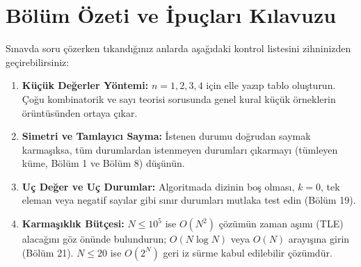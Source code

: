 \section{Bölüm Özeti ve İpuçları Kılavuzu}

Sınavda soru çözerken tıkandığınız anlarda aşağıdaki kontrol listesini zihninizden geçirebilirsiniz:

\begin{enumerate}
    \item \textbf{Küçük Değerler Yöntemi:} $n = 1, 2, 3, 4$ için elle yazıp tablo oluşturun. Çoğu kombinatorik ve sayı teorisi sorusunda genel kural küçük örneklerin örüntüsünden ortaya çıkar.
    \item \textbf{Simetri ve Tamlayıcı Sayma:} İstenen durumu doğrudan saymak karmaşıksa, tüm durumlardan istenmeyen durumları çıkarmayı (tümleyen küme, Bölüm 1 ve Bölüm 8) düşünün.
    \item \textbf{Uç Değer ve Uç Durumlar:} Algoritmada dizinin boş olması, $k=0$, tek eleman veya negatif sayılar gibi sınır durumları mutlaka test edin (Bölüm 19).
    \item \textbf{Karmaşıklık Bütçesi:} $N \le 10^5$ ise $O(N^2)$ çözümün zaman aşımı (TLE) alacağını göz önünde bulundurun; $O(N \log N)$ veya $O(N)$ arayışına girin (Bölüm 21). $N \le 20$ ise $O(2^N)$ geri iz sürme kabul edilebilir çözümdür.
\end{enumerate}
